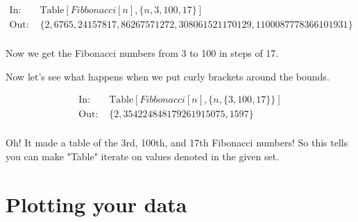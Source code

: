 \documentclass[11pt,letterpaper,twoside,titlepage]{report}
\begin{document}
				\begin{align*}
					\text{In: }& \text{Table} [ Fibbonacci[n] , \{ n,3,100,17 \} ] \\
					\text{Out: }& \{2,6765,24157817,86267571272,308061521170129,1100087778366101931\} \\
				\end{align*}
				
				Now we get the Fibonacci numbers from 3 to 100 in steps of 17.
				
				Now let's see what happens when we put curly brackets around the bounds.
				
				\begin{align*}
					\text{In: }& \text{Table} [ Fibbonacci[n] , \{ n, \{ 3,100,17 \} \} ] \\
					\text{Out: }& \{2,354224848179261915075,1597\} \\
				\end{align*}
				
				Oh! It made a table of the 3rd, 100th, and 17th Fibonacci numbers!  So this tells you can make "Table" iterate on values denoted in the given set.
				
			\section{Plotting your data}
			
\end{document}
